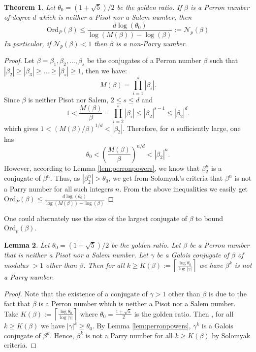\documentclass[12pt]{article}
\theoremstyle{plain}
\newtheorem{theorem}{Theorem}[section]
\newtheorem{lemma}[theorem]{Lemma}
\theoremstyle{remark}
\newcommand{\Ord}{\mathrm{Ord}}
\newcommand{\OrdP}{\mathrm{Ord}_{P}}
\begin{document}
\begin{theorem}\label{Orbmaj}
 Let $\theta_0 = (1+\sqrt{5})/2$ be the golden ratio. If $\beta$ is a Perron number of degree $d$ which is neither a Pisot nor a Salem number, then
 $$
 \OrdP(\beta) \leq \frac{d \log (\theta_0)}{\log( M(\beta)) - \log(\beta)}:=\mathcal{N}_p(\beta)
 $$
 In particular, if $\mathcal{N}_p(\beta)<1$ then $\beta $ is a non-Parry number.
\end{theorem}
\begin{proof}
Let $\beta = \beta_1, \beta_2, \dots, \beta_s$ be the conjugates of a Perron number $\beta$ such that $|\beta_2|\geq |\beta_3| \geq \ldots \geq |\beta_s| \geq 1$, then we have:
\[
M(\beta) = \prod_{i=1}^s |\beta_i|.
\]
Since $\beta$ is neither Pisot nor Salem, $2 \leq s \leq d$ and
\[
1 < \frac{M(\beta)}{\beta} = \prod_{i=2}^s |\beta_i| \leq |\beta_2|^{s-1} \leq |\beta_2|^d.
\]
which gives $1<(M(\beta)/\beta)^{1/d} < |\beta_2|$.
Therefore, for $n$ sufficiently large, one has
\[
\theta_0 < \left( \frac{M(\beta)}{\beta} \right)^{n/d} < |\beta_2|^n.
\]
However, according to Lemma \ref{lem:perronpowers}, we know that $\beta_2^n$ is a conjugate of $\beta^n$. Thus, as $|\beta_2^n| > \theta_0$, we get from Solomyak's criteria that $\beta^n$ is not a Parry number for all such integers $n$. From the above inequalities we easily get $\OrdP(\beta) \leq \frac{d \log (\theta_0)}{\log( M(\beta)) - \log(\beta)} $
\end{proof}

One could alternately use the size of the largest conjugate of $\beta$ to bound $\Ord_p(\beta)$.

\begin{lemma}
 \label{lem:K}
 Let $\theta_0 = (1+\sqrt{5})/2$ be the golden ratio. 
 Let $\beta$ be a Perron number that is neither a Pisot nor a Salem number.
 Let $\gamma $ be a Galois conjugate of $\beta$ of modulus $>1$ other than $\beta$. Then for all $k\geq K(\beta):=\left\lceil \frac{\log{\theta_0}}{\log|\gamma|}\right\rceil$ we have $\beta^k$ is not a Parry number.
\end{lemma}

\begin{proof} Note that the existence of a conjugate of $\gamma> 1$ other than $\beta $ is due to the fact that $\beta $ is a Perron number which is neither a Pisot nor a Salem number. 
 Take $K(\beta) := \left\lceil \frac{\log{\theta_0}}{\log|\gamma|}\right\rceil$ where $\theta_0= \frac{1+\sqrt{5}}{2}$ is the golden ratio. Then , for all $k\geq K(\beta)$ we have $|\gamma|^k\geq \theta_0$. By Lemma \ref{lem:perronpowers}, $\gamma^k$ is a Galois conjugate of $\beta^k$. Hence, $\beta^k $ is not a Parry number for all $k\geq K(\beta) $ by Solomyak criteria.
\end{proof}
\end{document}
